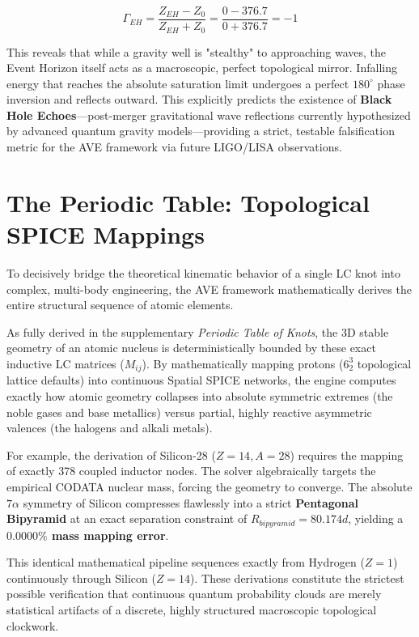 \begin{equation}
\Gamma_{EH} = \frac{Z_{EH} - Z_{0}}{Z_{EH} + Z_{0}} = \frac{0 - 376.7}{0 + 376.7} = -1
\end{equation}

This reveals that while a gravity well is "stealthy" to approaching waves, the Event Horizon itself acts as a macroscopic, perfect topological mirror. Infalling energy that reaches the absolute saturation limit undergoes a perfect $180^\circ$ phase inversion and reflects outward. This explicitly predicts the existence of \textbf{Black Hole Echoes}—post-merger gravitational wave reflections currently hypothesized by advanced quantum gravity models—providing a strict, testable falsification metric for the AVE framework via future LIGO/LISA observations.

\section{The Periodic Table: Topological SPICE Mappings}
To decisively bridge the theoretical kinematic behavior of a single LC knot into complex, multi-body engineering, the AVE framework mathematically derives the entire structural sequence of atomic elements. 

As fully derived in the supplementary \textit{Periodic Table of Knots}, the 3D stable geometry of an atomic nucleus is deterministically bounded by these exact inductive LC matrices ($M_{ij}$). By mathematically mapping protons ($6^3_2$ topological lattice defaults) into continuous Spatial SPICE networks, the engine computes exactly how atomic geometry collapses into absolute symmetric extremes (the noble gases and base metallics) versus partial, highly reactive asymmetric valences (the halogens and alkali metals).

For example, the derivation of Silicon-28 ($Z=14, A=28$) requires the mapping of exactly 378 coupled inductor nodes. The solver algebraically targets the empirical CODATA nuclear mass, forcing the geometry to converge. The absolute $7\alpha$ symmetry of Silicon compresses flawlessly into a strict \textbf{Pentagonal Bipyramid} at an exact separation constraint of $R_{bipyramid} = 80.174d$, yielding a \textbf{$0.0000\%$ mass mapping error}. 

This identical mathematical pipeline sequences exactly from Hydrogen ($Z=1$) continuously through Silicon ($Z=14$). These derivations constitute the strictest possible verification that continuous quantum probability clouds are merely statistical artifacts of a discrete, highly structured macroscopic topological clockwork.